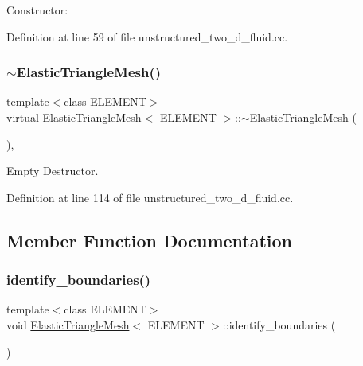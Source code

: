 Constructor\+: 



Definition at line 59 of file unstructured\+\_\+two\+\_\+d\+\_\+fluid.\+cc.

\mbox{\label{classElasticTriangleMesh_ade80b912f1bb791e5f4fac35abf90504}} 
\subsubsection{\texorpdfstring{$\sim$\+Elastic\+Triangle\+Mesh()}{~ElasticTriangleMesh()}}
{\footnotesize\ttfamily template$<$class E\+L\+E\+M\+E\+NT$>$ \\
virtual \hyperlink{classElasticTriangleMesh}{Elastic\+Triangle\+Mesh}$<$ E\+L\+E\+M\+E\+NT $>$\+::$\sim$\hyperlink{classElasticTriangleMesh}{Elastic\+Triangle\+Mesh} (\begin{DoxyParamCaption}{ }\end{DoxyParamCaption})\hspace{0.3cm}{\ttfamily [inline]}, {\ttfamily [virtual]}}



Empty Destructor. 



Definition at line 114 of file unstructured\+\_\+two\+\_\+d\+\_\+fluid.\+cc.



\subsection{Member Function Documentation}
\mbox{\label{classElasticTriangleMesh_aa83cad3dfdd980f95bf0dab6fd97bf22}} 
\subsubsection{\texorpdfstring{identify\+\_\+boundaries()}{identify\_boundaries()}}
{\footnotesize\ttfamily template$<$class E\+L\+E\+M\+E\+NT$>$ \\
void \hyperlink{classElasticTriangleMesh}{Elastic\+Triangle\+Mesh}$<$ E\+L\+E\+M\+E\+NT $>$\+::identify\+\_\+boundaries (\begin{DoxyParamCaption}{ }\end{DoxyParamCaption})\hspace{0.3cm}{\ttfamily [inline]}}



